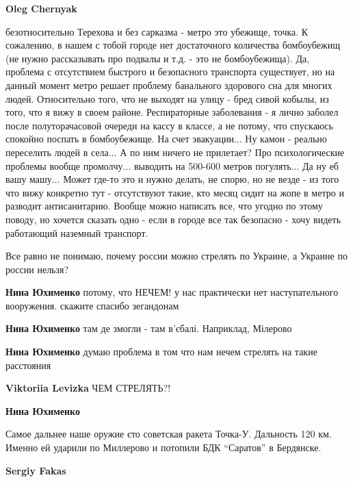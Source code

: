 \begin{itemize}
\begin{itemize} %
\textbf{Oleg Chernyak} 

безотносительно Терехова и без сарказма - метро это убежище, точка. К
сожалению, в нашем с тобой городе нет достаточного количества бомбоубежищ (не
нужно рассказывать про подвалы и т.д. - это не бомбоубежища). Да, проблема с
отсутствием быстрого и безопасного транспорта существует, но на данный момент
метро решает проблему банального здорового сна для многих людей. Относительно
того, что не выходят на улицу - бред сивой кобылы, из того, что я вижу в своем
районе. Респираторные заболевания - я лично заболел после полуторачасовой
очереди на кассу в классе, а не потому, что спускаюсь спокойно поспать в
бомбоубежище. На счет эвакуации... Ну камон - реально переселить людей в
села... А по ним ничего не прилетает? Про психологические проблемы вообще
промолчу... выводить на 500-600 метров погулять... Да ну еб вашу машу... Может
где-то это и нужно делать, не спорю, но не везде - из того что вижу конкретно
тут - отсутствуют такие, кто месяц сидит на жопе в метро и разводит
антисанитарию. Вообще можно написать все, что угодно по этому поводу, но
хочется сказать одно - если в городе все так безопасно - хочу видеть работающий
наземный транспорт.

\end{itemize} %


Все равно не понимаю, почему россии можно стрелять по Украине, а Украине по
россии нельзя?

\begin{itemize} %
\textbf{Нина Юхименко} потому, что НЕЧЕМ! у нас практически нет наступательного вооружения. скажите спасибо зегандонам

\textbf{Нина Юхименко} там де змогли - там в'єбалі. Наприклад, Мілерово

\textbf{Нина Юхименко} думаю проблема в том что нам нечем стрелять на такие расстояния

\textbf{Viktoriia Levizka}
ЧЕМ СТРЕЛЯТЬ?!

\textbf{Нина Юхименко} 

Самое дальнее наше оружие єто советская ракета Точка-У. Дальность 120 км.
Именно ей ударили по Миллерово и потопили БДК \enquote{Саратов} в Бердянске.

\textbf{Sergiy Fakas} 


\end{itemize}
\end{itemize}
